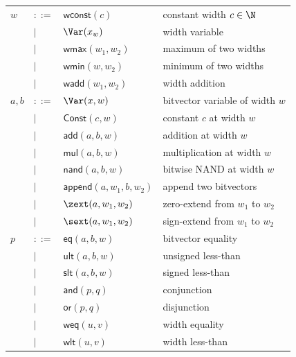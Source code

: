 \begin{figure}[htb]
\begin{minipage}{0.55\textwidth}
{\footnotesize
\begin{tabular}{llll}
$w$ & $::=$ & $\mathsf{wconst}(c)$ & constant width $c \in \N$ \\
      & $\mid$ & $\Var(x_w)$ & width variable \\
      & $\mid$ & $\mathsf{wmax}(w_1, w_2)$ & maximum of two widths \\
      & $\mid$ & $\mathsf{wmin}(w, w_2)$ & minimum of two widths \\
      & $\mid$ & $\mathsf{wadd}(w_1, w_2)$ & width addition \\[4pt]
$a, b$ & $::=$ & $\Var(x, w)$ & bitvector variable of width $w$ \\
    & $\mid$ & $\mathsf{Const}(c, w)$ & constant $c$ at width $w$ \\
    & $\mid$ & $\mathsf{add}(a, b, w)$ & addition at width $w$ \\
    & $\mid$ & $\mathsf{mul}(a, b, w)$ & multiplication at width $w$ \\
    & $\mid$ & $\mathsf{nand}(a, b, w)$ & bitwise NAND at width $w$ \\
    & $\mid$ & $\mathsf{append}(a, w_1,  b, w_2)$ & append two bitvectors \\
    & $\mid$ & $\zext(a, w_1, w_2)$ & zero-extend from $w_1$ to $w_2$ \\
    & $\mid$ & $\sext(a, w_1, w_2)$ & sign-extend from $w_1$ to $w_2$ \\[4pt]
$p$ & $::=$ & $\mathsf{eq}(a, b, w)$ & bitvector equality \\
    & $\mid$ & $\mathsf{ult}(a, b, w)$ & unsigned less-than \\
    & $\mid$ & $\mathsf{slt}(a, b, w)$ & signed less-than \\
    & $\mid$ & $\mathsf{and}(p, q)$ & conjunction \\
    & $\mid$ & $\mathsf{or}(p, q)$ & disjunction \\
    & $\mid$ & $\mathsf{weq}(u, v)$ & width equality \\
    & $\mid$ & $\mathsf{wlt}(u, v)$ & width less-than \\

\end{tabular}}
\end{minipage}
\end{figure}
